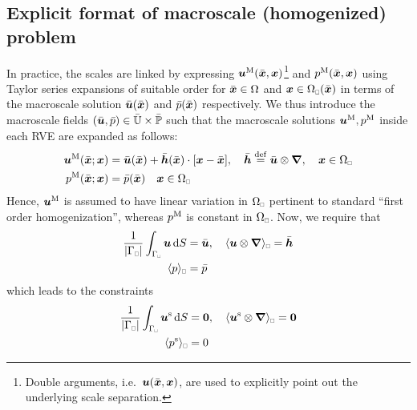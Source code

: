 \documentclass{bmcart}
\DeclarePairedDelimiter{\homgen}{\langle}{\rangle_\rve}
\newcommand{\rve}{
  {\mathchoice
   {\mbox{\scalebox{0.67}{$\Box$}}}
   {\mbox{\scalebox{0.67}{$\Box$}}}
   {\mbox{\scalebox{0.5}{$\Box$}}}
   {\mbox{\scalebox{0.375}{$\Box$}}}
  }
}
\begin{document}
\subsection{Explicit format of macroscale (homogenized) problem}
In practice, the scales are linked  by expressing $\boldsymbol{u}^{\mathrm{M}}(\bar{\boldsymbol{x}},{\boldsymbol{x}})$\footnote{Double arguments, i.e.\ $\boldsymbol{u}(\bar{\boldsymbol{x}},\boldsymbol{x})$, are used to explicitly point out the underlying scale separation.} and $p^{\mathrm{M}}(\bar{\boldsymbol{x}},\boldsymbol{x})$ using Taylor series expansions of suitable order for $\bar{\boldsymbol{x}}\in\Omega$ and $\ta{x}\in\Omega_\rve(\bar{\ta{x}})$
in terms of the macroscale solution $\bar{\boldsymbol{u}}(\bar{\boldsymbol{x}})$ and $\bar{p}(\bar{\boldsymbol{x}})$ respectively.
We thus introduce the macroscale fields $(\bar{\boldsymbol{u}},\bar{p})\in\bar{\mathbb{U}}\times\bar{\mathbb{P}}$ such that the macroscale solutions $\boldsymbol{u}^{\mathrm{M}}, p^{\mathrm{M}}$ inside each RVE are expanded as follows:
\begin{subequations}\label{eq12}
\begin{align}
    \ta{u}^\macro(\bar{\ta{x}};\ta{x}) &= \bar{\ta{u}}(\bar{\ta{x}}) + \bar{\ts{h}}(\bar{\ta{x}}) \cdot [\ta{x}-\bar{\ta{x}}], \quad \bar{\ts{h}}\defeq\bar{\ta{u}}\outerp\diff, \quad \ta{x}\in\Omega_\rve
\label{eq12a} \\
    p^\macro(\bar{\ta{x}};\ta{x}) &= \bar{p}(\bar{\ta{x}}) \quad
    \ta{x}\in\Omega_\rve
\label{eq12b}
\end{align}
\end{subequations}
Hence, $\boldsymbol{u}^{\mathrm{M}}$ is assumed to have linear variation in $\Omega_\rve$ pertinent to standard ``first order homogenization'', whereas $p^{\mathrm{M}}$ is constant in $\Omega_\rve$.
Now, we require that
\begin{subequations}\label{eq14}
\begin{align}
    \frac{1}{|\Gamma_\rve|} \int_{\Gamma_\rve} \ta{u} \dif S &= \bar{\ta{u}}, \quad
    \homgen{ \ta{u}\outerp\diff} = \bar{\ta{h}}
\label{eq14a} \\
    \homgen{p} &= \bar{p}
\label{eq14b}
\end{align}
\end{subequations}
which leads to the constraints
\begin{subequations}\label{eq13}
\begin{align}
    \frac{1}{|\Gamma_\rve|} \int_{\Gamma_\rve} \ta{u}^\fluct \dif S &= \ta{0}, \quad
    \homgen{\ta{u}^\fluct\outerp\diff} = \ta{0}
\label{eq13a} \\
    \homgen{ p^\fluct }&= 0
\label{eq13b}
\end{align}
\end{subequations}
\end{document}
